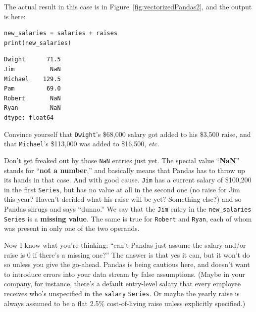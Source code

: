 The actual result in this case is in Figure~\ref{fig:vectorizedPandas2}, and
the output is here:


\begin{Verbatim}[fontsize=\small,samepage=true,frame=single,framesep=3mm]
new_salaries = salaries + raises
print(new_salaries)
\end{Verbatim}

\begin{Verbatim}[fontsize=\small,samepage=true,frame=leftline,framesep=5mm,framerule=1mm]
Dwight      71.5
Jim          NaN
Michael    129.5
Pam         69.0
Robert       NaN
Ryan         NaN
dtype: float64
\end{Verbatim}


Convince yourself that \texttt{Dwight}'s \$68,000 salary got added to his
\$3,500 raise, and that \texttt{Michael}'s \$113,000 was added to \$16,500,
\textit{etc.}

Don't get freaked out by those \texttt{NaN} entries just yet. The special value
``\textbf{NaN}'' stands for ``\textbf{not a number},'' and basically means that
Pandas has to throw up its hands in that case. And with good cause.
\texttt{Jim} has a current salary of \$100,200 in the first \texttt{Series},
but has no value at all in the second one (no raise for Jim this year? Haven't
decided what his raise will be yet? Something else?) and so Pandas shrugs and
says ``dunno.'' We say that the \texttt{Jim} entry in the
\texttt{new\_salaries} \texttt{Series} is a \textbf{missing value}. The same is
true for \texttt{Robert} and \texttt{Ryan}, each of whom was present in only
one of the two operands.

Now I know what you're thinking: ``can't Pandas just assume the salary and/or
raise is 0 if there's a missing one?'' The answer is that yes it can, but it
won't do so unless you give the go-ahead. Pandas is being cautious here, and
doesn't want to introduce errors into your data stream by false assumptions.
(Maybe in your company, for instance, there's a default entry-level salary that
every employee receives who's unspecified in the \texttt{salary}
\texttt{Series}. Or maybe the yearly raise is always assumed to be a flat 2.5\%
cost-of-living raise unless explicitly specified.)


